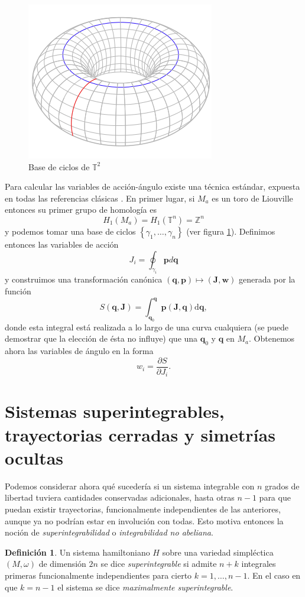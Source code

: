 \documentclass[12pt,a4paper,twoside]{article}
\theoremstyle{definition} \newtheorem{defn}[thm]{Definición}
\theoremstyle{definition} \newtheorem{ejemplo}[thm]{Ejemplo}
\theoremstyle{definition} \newtheorem{ejercicio}[thm]{Ejercicio}
\theoremstyle{remark} \newtheorem*{obs}{Observación}
\def\TT{\mathbb{T}}
\def\dd{\mathrm{d}}
\newcommand{\vect}[1]{\mathbf{#1}}
\begin{document}
       \begin{figure}[h]
	 \centering
	 \includegraphics[width=.4\textwidth]{homology}
	 \caption{\small Base de ciclos de $\TT^2$}
	 \label{fig:toro}
       \end{figure}

       Para calcular las variables de acción-ángulo existe una técnica estándar, expuesta en todas las referencias clásicas \cite{arnold,goldstein,landau}. En primer lugar, si $M_a$ es un toro de Liouville entonces su primer grupo de homología es
       \begin{equation*}
	 H_1(M_a)=H_1(\mathbb{T} ^n)=\mathbb{Z} ^n
       \end{equation*}
       y podemos tomar una base de ciclos $\left\{ \gamma_1,\dots,\gamma_n \right\}$ (ver figura \ref{fig:toro}). Definimos entonces las variables de acción
       \begin{equation}
	 J_i=\oint_{\gamma_i} \vect{p} d \vect{q}
       \end{equation}
       y construimos una transformación canónica $(\vect{q},\vect{p})\mapsto (\vect{J},\vect{w})$ generada por la función
       \begin{equation}
	 S(\vect{q},\vect{J})=\int_{\vect{q}_0}^{\vect{q}}\vect{p}(\vect{J},\vect{q}) \dd \vect{q} ,	
       \end{equation}
       donde esta integral está realizada a lo largo de una curva cualquiera (se puede demostrar que la elección de ésta no influye) que una $\vect{q}_0$ y $\vect{q}$ en $M_a$. Obtenemos ahora las variables de ángulo en la forma
       \begin{equation}
	 w_i=\frac{\partial S}{\partial J_i}. 
       \end{equation}

  \section{Sistemas superintegrables, trayectorias cerradas y simetrías ocultas}
  Podemos considerar ahora qué sucedería si un sistema integrable con $n$ grados de libertad tuviera cantidades conservadas adicionales, hasta otras $n-1$ para que puedan existir trayectorias, funcionalmente independientes de las anteriores, aunque ya no podrían estar en involución con todas. Esto motiva entonces la noción de \emph{superintegrabilidad} o \emph{integrabilidad no abeliana}.
  \begin{defn}
    Un sistema hamiltoniano $H$ sobre una variedad simpléctica $(M,\omega)$ de dimensión $2n$ se dice \emph{superintegrable} si admite $n+k$ integrales primeras funcionalmente independientes para cierto $k=1,\dots,n-1$. En el caso en que $k=n-1$ el sistema se dice \emph{maximalmente superintegrable}.
  \end{defn}
\end{document}
